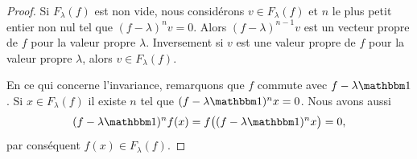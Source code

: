 \begin{proof}
    Si \( F_{\lambda}(f)\) est non vide, nous considérons \( v\in F_{\lambda}(f)\) et \( n\) le plus petit entier non nul tel que \( (f-\lambda)^nv=0\). Alors \( (f-\lambda)^{n-1}v\) est un vecteur propre de \( f\) pour la valeur propre \( \lambda\). Inversement si \( v\) est une valeur propre de \( f\) pour la valeur propre \( \lambda\), alors \( v\in F_{\lambda}(f)\).

    En ce qui concerne l'invariance, remarquons que \( f\) commute avec \( f-\lambda\mtu\). Si \( x\in F_{\lambda}(f)\) il existe \( n\) tel que \( (f-\lambda\mtu)^nx=0\). Nous avons aussi
    \begin{equation}
        (f-\lambda\mtu)^nf(x)=f\big( (f-\lambda\mtu)^nx \big)=0,
    \end{equation}
    par conséquent \( f(x)\in F_{\lambda}(f)\).
\end{proof}

